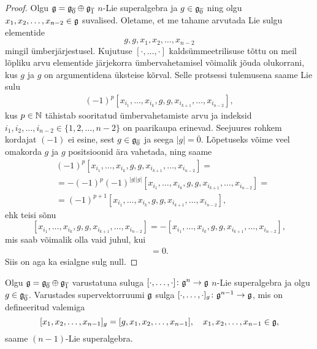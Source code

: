 \begin{proof}
    Olgu $\mathfrak{g} = \mathfrak{g}_{\overline{0}} \oplus \mathfrak{g}_{\overline{1}}$
    $n$-Lie superalgebra ja $g \in \mathfrak{g}_{\overline{0}}$ ning olgu
    $x_1, x_2, \dots, x_{n-2} \in \mathfrak{g}$ suvalised. Oletame, et me
    tahame arvutada Lie sulgu elementide
    \[ g, g, x_1, x_2, \dots, x_{n-2} \]
    mingil ümberjärjestusel. Kujutuse $[\cdot, \dots, \cdot]$
    kaldsümmeetrilisuse tõttu on meil lõpliku arvu elementide
    järjekorra ümbervahetamisel võimalik jõuda olukorrani, kus
    $g$ ja $g$ on argumentidena üksteise kõrval. Selle protsessi
    tulemusena saame Lie sulu
    \begin{align*}
        (-1)^p [x_{i_1}, \dots, x_{i_k}, g, g,
            x_{i_{k+1}}, \dots, x_{i_{n-2}}],
    \end{align*}
    kus $p \in \mathbb{N}$ tähistab sooritatud ümbervahetamiste arvu
    ja indeksid $i_1, i_2, \dots, i_{n-2} \in \{1, 2, \dots, n-2\}$ on
    paarikaupa erinevad. Seejuures rohkem kordajat $(-1)$ ei esine,
    sest $g \in \mathfrak{g}_{\overline{0}}$ ja seega $|g| = \overline{0}$.
    Lõpetuseks võime veel omakorda $g$ ja $g$ positsioonid ära
    vahetada, ning saame
    \begin{align*}
        &(-1)^p [x_{i_1}, \dots, x_{i_k}, g, g,
            x_{i_{k+1}}, \dots, x_{i_{n-2}}] = \\
        &= -(-1)^p (-1)^{|g||g|} [x_{i_1}, \dots,
            x_{i_k}, g, g, x_{i_{k+1}}, \dots, x_{i_{n-2}}] = \\
        &= (-1)^{p+1} [x_{i_1}, \dots,
            x_{i_k}, g, g, x_{i_{k+1}}, \dots, x_{i_{n-2}}],
    \end{align*}
    ehk teisi sõnu
    \[
        [x_{i_1}, \dots, x_{i_k}, g, g, x_{i_{k+1}},
        \dots, x_{i_{n-2}}] =
        -[x_{i_1}, \dots, x_{i_k}, g, g, x_{i_{k+1}},
        \dots, x_{i_{n-2}}],
    \]
    mis saab võimalik olla vaid juhul, kui
    \begin{align*}
        [x_{i_1}, \dots, x_{i_k}, g, g, x_{i_{k+1}},
        \dots, x_{i_{n-2}}] = 0.
    \end{align*}
    Siis on aga ka esialgne sulg null.
\end{proof}

\begin{lau}
    Olgu $\mathfrak{g} = \mathfrak{g}_{\overline{0}} \oplus \mathfrak{g}_{\overline{1}}$ varustatuna
    suluga $[\cdot, \dots, \cdot] \colon \mathfrak{g}^n \to \mathfrak{g}$ $n$-Lie
    superalgebra ja olgu $g \in \mathfrak{g}_{\overline{0}}$. Varustades
    supervektorruumi $\mathfrak{g}$ sulga
    $[\cdot, \dots, \cdot]_g \colon \mathfrak{g}^{n-1} \to \mathfrak{g}$, mis on
    defineeritud valemiga
    \[
        [x_1, x_2, \dots, x_{n-1}]_g = [g, x_1, x_2, \dots, x_{n-1}],
        \quad x_1, x_2, \dots, x_{n-1} \in \mathfrak{g},
    \]
    saame $(n-1)$-Lie superalgebra.
\end{lau}

